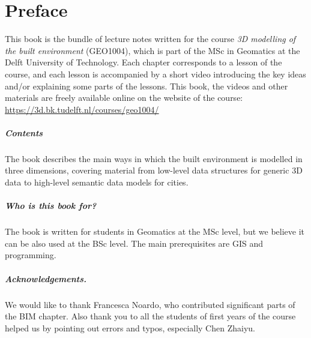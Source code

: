 


\chapter*{Preface}

This book is the bundle of lecture notes written for the course \emph{3D modelling of the built environment} (GEO1004), which is part of the MSc in Geomatics at the Delft University of Technology.
Each chapter corresponds to a lesson of the course, and each lesson is accompanied by a short video introducing the key ideas and/or explaining some parts of the lessons.
This book, the videos and other materials are freely available online on the website of the course: \url{https://3d.bk.tudelft.nl/courses/geo1004/}

\paragraph*{Contents}
The book describes the main ways in which the built environment is modelled in three dimensions, covering material from low-level data structures for generic 3D data to high-level semantic data models for cities.

\paragraph*{Who is this book for?}
The book is written for students in Geomatics at the MSc level, but we believe it can be also used at the BSc level.
The main prerequisites are GIS and programming.

\paragraph*{Acknowledgements.}
We would like to thank Francesca Noardo, who contributed significant parts of the BIM chapter.
Also thank you to all the students of first years of the course helped us by pointing out errors and typos, especially Chen Zhaiyu.




